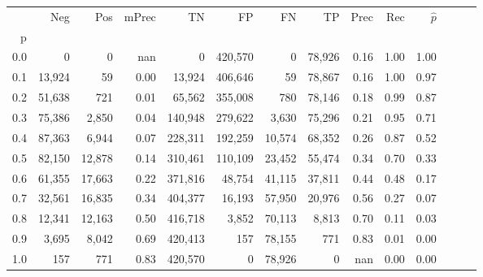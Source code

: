 \begin{tabular}{rrrrrrrrrrrrrr}
\toprule
{} &     Neg &     Pos & mPrec &       TN &       FP &      FN &      TP &  Prec &   Rec & $\hat{p}$ \\
p   &         &         &       &          &          &         &         &       &       &           \\
\midrule
0.0 &       0 &       0 &   nan &        0 &  420,570 &       0 &  78,926 &  0.16 &  1.00 &      1.00 \\
0.1 &  13,924 &      59 &  0.00 &   13,924 &  406,646 &      59 &  78,867 &  0.16 &  1.00 &      0.97 \\
0.2 &  51,638 &     721 &  0.01 &   65,562 &  355,008 &     780 &  78,146 &  0.18 &  0.99 &      0.87 \\
0.3 &  75,386 &   2,850 &  0.04 &  140,948 &  279,622 &   3,630 &  75,296 &  0.21 &  0.95 &      0.71 \\
0.4 &  87,363 &   6,944 &  0.07 &  228,311 &  192,259 &  10,574 &  68,352 &  0.26 &  0.87 &      0.52 \\
0.5 &  82,150 &  12,878 &  0.14 &  310,461 &  110,109 &  23,452 &  55,474 &  0.34 &  0.70 &      0.33 \\
0.6 &  61,355 &  17,663 &  0.22 &  371,816 &   48,754 &  41,115 &  37,811 &  0.44 &  0.48 &      0.17 \\
0.7 &  32,561 &  16,835 &  0.34 &  404,377 &   16,193 &  57,950 &  20,976 &  0.56 &  0.27 &      0.07 \\
0.8 &  12,341 &  12,163 &  0.50 &  416,718 &    3,852 &  70,113 &   8,813 &  0.70 &  0.11 &      0.03 \\
0.9 &   3,695 &   8,042 &  0.69 &  420,413 &      157 &  78,155 &     771 &  0.83 &  0.01 &      0.00 \\
1.0 &     157 &     771 &  0.83 &  420,570 &        0 &  78,926 &       0 &   nan &  0.00 &      0.00 \\
\bottomrule
\end{tabular}
